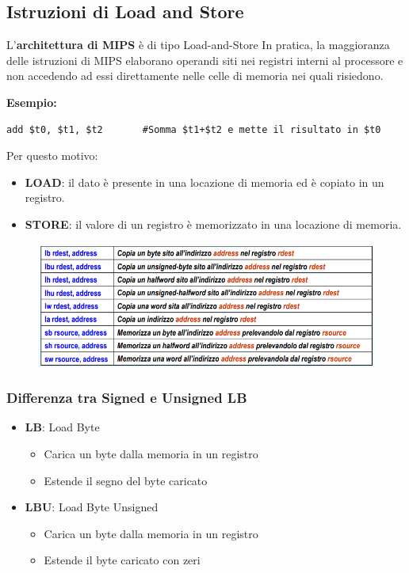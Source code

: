 \documentclass[12pt]{article} %
\begin{document}
\subsection{Istruzioni di Load and Store}
L'\textbf{architettura di MIPS} è di tipo Load-and-Store
In pratica, la maggioranza delle istruzioni di MIPS elaborano operandi siti nei
registri interni al processore e non accedendo ad essi direttamente nelle celle di
memoria nei quali risiedono. \par\medskip\noindent
\textbf{Esempio:}
\begin{lstlisting}
add $t0, $t1, $t2       #Somma $t1+$t2 e mette il risultato in $t0
\end{lstlisting}
\par\medskip\noindent
Per questo motivo:
\begin{itemize}
    \item \textbf{LOAD}: il dato è presente in una locazione di memoria ed è copiato in un registro.
    \item \textbf{STORE}: il valore di un registro è memorizzato in una locazione di memoria.
\end{itemize}
\begin{figure}[h]
    \centering
    \includegraphics[width=1\linewidth]{load.png}
\end{figure}
\newpage\noindent
\subsubsection{Differenza tra Signed e Unsigned LB}
\begin{itemize}
    \item \textbf{LB}: Load Byte
    \begin{itemize}
        \item Carica un byte dalla memoria in un registro
        \item Estende il segno del byte caricato
    \end{itemize}
    \item \textbf{LBU}: Load Byte Unsigned
    \begin{itemize}
        \item Carica un byte dalla memoria in un registro
        \item Estende il byte caricato con zeri
    \end{itemize}
\end{itemize}
\end{document}
